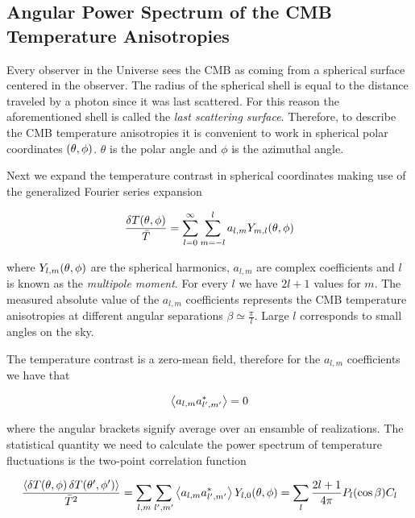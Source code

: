 \subsection{Angular Power Spectrum of the CMB Temperature Anisotropies}

Every observer in the Universe sees the CMB as coming from a spherical
surface centered in the observer. The radius of the spherical shell is
equal to the distance traveled by a photon since it was last scattered.
For this reason the aforementioned shell is called the \emph{last
scattering surface}. Therefore, to describe the CMB temperature
anisotropies it is convenient to work in spherical polar
coordinates $\qty(\theta,\phi)$. $\theta$ is the polar angle and $\phi$ is the
azimuthal angle.

Next we expand the temperature contrast in spherical coordinates making use
of the generalized Fourier series expansion

\begin{equation}
        \frac{\var{T\qty(\theta,\phi)}}{\bar T} =
        \sum^\infty_{l=0}\sum^l_{m=-l} a_{l,m}
        Y_{m,l}\qty(\theta,\phi)
\end{equation}

where $Y_{l,m}\qty(\theta,\phi)$ are the spherical harmonics, $a_{l,m}$ are
complex coefficients and $l$ is known as the \emph{multipole moment}.
For every $l$ we have $2l + 1$ values for $m$.
The measured absolute value of the $a_{l,m}$ coefficients represents the
CMB temperature anisotropies at different angular separations $\beta \simeq
\frac{\pi}{l}$. Large $l$ corresponds to small angles on the sky.

The temperature contrast is a zero-mean field, therefore for the $a_{l,m}$
coefficients we have that

\begin{equation}
        \expval{a_{l,m} a^*_{l',m'}} = 0
\end{equation}

where the angular brackets signify average over an ensamble of
realizations. The statistical quantity we need to calculate the power
spectrum of temperature fluctuations is the two-point correlation function

\begin{equation}
        \frac{\expval{\var{T\qty(\theta,\phi)} \var{T\qty(\theta',\phi')}}}
        {\bar T^2} =
        \sum_{l,m}\sum_{l',m'} \expval{a_{l,m} a^*_{l',m'}}
        Y_{l,0}\qty(\theta,\phi) =
        \sum_l \frac{2l + 1}{4\pi} P_l\qty(\cos \beta) C_l
\end{equation}

